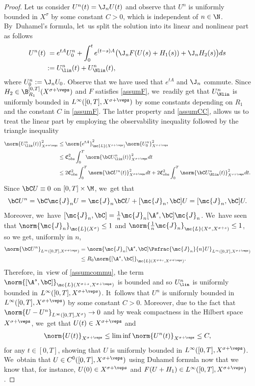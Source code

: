 \begin{proof}
Let us consider $U^n(t)=\J_nU(t)$ and observe that $U^n$ is uniformly bounded in $X^\sigma$ by some constant $C>0$, which is independent of $n\in \N$. By~Duhamel's formula, let~us split the solution into its linear and nonlinear part as follows
\begin{align*}
U^n(t)&\hphantom{:}=e^{tA}U_0^n+\int_0^t e^{(t-s)A}\big(\J_nF(U(s)+H_1(s))+\J_nH_2(s)\big)ds\\ &:=U_{\lin}^n(t)+U_{\Nlin}^n(t),
\end{align*}
where $U_0^n:=\J_n U_0$. Observe that we have used that $e^{tA}$ and $\J_n$ commute. Since \hbox{$H_2\in \B_{R_{1}}^{[0, T]}(X^{\sigma+\veps})$} and $F$ satisfies \cref{assumF}, we~readily get that $U_{\Nlin}^n$ is uniformly bounded in $L^\infty([0, T], X^{\sigma+\veps})$ by some constants depending on $R_{1}$ and the constant $C$ in \cref{assumF}. The latter property and \cref{assumCC}, allows us to treat the linear part by employing the observability inequality followed by the triangle inequality
\begin{align*}
\norm{U_{\lin}^n(t)}_{X^{\sigma+\veps}}^2&\leq \norm{e^{tA}}_{\mc{L}(X^{\sigma+\veps})}^2 \norm{U_0^n}_{X^{\sigma+\veps}}^2\\
&\leq \mathfrak{C}_{\textup{obs}}^2\int_0^T \norm{\bC U_{\lin}^n(t)}_{X^{\sigma+\veps}}^2dt\\
&\leq 2\mathfrak{C}_{\textup{obs}}^2\int_0^T \norm{\bC U^n(t)}_{X^{\sigma+\veps}}^2dt+2\mathfrak{C}_{\textup{obs}}^2\int_0^T \norm{\bC U_{\Nlin}^n(t)}_{X^{\sigma+\veps}}^2dt.
\end{align*}
Since $\bC U\equiv 0$ on $[0, T]\times \M$, we~get that
\[
\bC U^n=\bC\mc{J}_n U=\mc{J}_n\bC U+[\mc{J}_n,\bC]U=[\mc{J}_n,\bC]U.
\]
Moreover, we~have $[\mc{J}_n,\bC]=\frac{1}{n}\mc{J}_n[\A^s,\bC]\mc{J}_n$. We~have seen that $\norm{\mc{J}_n}_{\mc{L}(X^\sigma)}\leq 1$ and $\norm{\frac{1}{n}\mc{J}_n}_{\mc{L}(X^{\sigma}, X^{\sigma+s})}\leq 1$, so we get, uniformly in $n$,
\begin{align*}
\norm{\bC U^n}_{L^\infty([0, T], X^{\sigma+\veps})}&=\norm{\mc{J}_n[\A^s,\bC]\Psfrac{\mc{J}_n}{n} U}_{L^\infty([0, T], X^{\sigma+\veps})}\\
&\leq R_0\norm{[\A^s,\bC]}_{\mc{L}(X^{\sigma+s}, X^{\sigma+\veps})}.
\end{align*}
Therefore, in~view of \cref{assumcommu}, the term $\norm{[\A^s,\bC]}_{\mc{L}(X^{\sigma+s}, X^{\sigma+\veps})}$ is bounded and so $U_{\lin}^n$ is uniformly bounded in $L^\infty([0, T], X^{\sigma+\veps})$. It~follows that $U^n$ is uniformly bounded in $L^\infty([0, T], X^{\sigma+\veps})$ by some constant $C>0$. Moreover, due to the fact that $\norm{U-U^n}_{L^\infty([0, T], X^\sigma)}\to 0$ and by weak compactness in the Hilbert space $X^{\sigma+\veps}$, we~get that $U(t)\in X^{\sigma+\veps}$ and
\begin{align*}
\norm{U(t)}_{X^{\sigma+\veps}}\leq \liminf \norm{U^n(t)}_{X^{\sigma+\veps}}\leq C,
\end{align*}
for any $t\in [0, T]$, showing that $U$ is uniformly bounded in $L^\infty([0, T], X^{\sigma+\veps})$. We~obtain that $U\in C^0([0, T], X^{\sigma+\veps})$ using Duhamel formula now that we know that, for instance, $U(0)\in X^{\sigma+\veps}$ and $F(U+H_1)\in L^\infty([0, T], X^{\sigma+\veps})$.
\end{proof}
